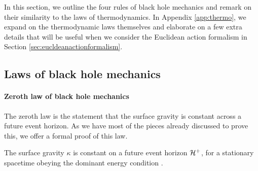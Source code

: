 In this section, we outline the four rules of black hole mechanics and remark on their similarity to the laws of thermodynamics. In Appendix \ref{app:thermo}, we expand on the thermodynamic laws themselves and elaborate on a few extra details that will be useful when we consider the Euclidean action formalism in Section \ref{sec:eucldeanactionformalism}.

\subsection{Laws of black hole mechanics}

\paragraph{Zeroth law of black hole mechanics} 

The zeroth law is the statement that the surface gravity is constant across a future event horizon. As we have most of the pieces already discussed to prove this, we offer a formal proof of this law. 

\begin{thm}
	The surface gravity $\kappa$ is constant on a future event horizon ${\cal H}^+$, for a stationary spacetime obeying the dominant energy condition \cite{Bardeen:1973gs}.  
\end{thm}


